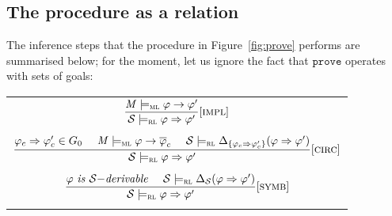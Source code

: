 \documentclass[conference]{IEEEtran}
\newenvironment{todo}{\medskip\hrule\smallskip\noindent}{\smallskip\hrule\medskip}
\newcommand{\vr}[1]{\begin{todo}\textcolor{blue}{Vlad:}\\ \color{orange}{#1}\color{black}\end{todo}}
\newcommand{\vr}[1]{}
\newcommand{\M}{\mathit{M}}
\renewcommand{\S}{\mathcal{S}}
\newcommand{\Ra}{\Rightarrow}
\renewcommand{\implies}{\rightarrow}
\newcommand{\ML}{\textsc{ml}\xspace}
\newcommand{\RL}{\textsc{rl}\xspace}
\newcommand{\rrule}[2]{{#1} \Ra{#2}}
\newcommand{\modelsml}{\models_\ML}
\newcommand{\modelsrl}{\models_\RL}
\newcommand{\coqtt}[1]{{\small \texttt{#1}}}
\newcommand{\cand}{\pmb{\land}}
\newcommand{\cforall}{\pmb{\forall}}
\begin{document}
%
%
%
%





\subsection{The procedure as a relation}
\label{sec:ps}


The inference steps that the procedure in Figure~\ref{fig:prove} performs are summarised below;
for the moment, let us ignore the fact that $\texttt{prove}$ operates with sets of goals:\\



\begin{center}
\begin{tabular}{c}
$\dfrac{\M\modelsml \varphi \implies \varphi'}{\S \modelsrl \rrule{\varphi}{\varphi'}}{[\textsc{impl}]}$\\\\
$\dfrac{ \rrule{\varphi_c}{\varphi'_c} \in G_0 ~~~~ \M\modelsml \varphi \implies \overline{\varphi}_{c}~~~~ \S \modelsrl \Delta_{\{ \rrule{\varphi_c}{\varphi'_c} \}}(\rrule{\varphi}{\varphi'})}
{ \S \modelsrl \rrule{\varphi}{\varphi'}}{[\textsc{circ}]}$\\\\
$\dfrac{\varphi~\mathit{is}~\S\mathit{-derivable} ~~~~ \S \modelsrl \Delta_\S(\rrule{\varphi}{\varphi'})}{\S \modelsrl \rrule{\varphi}{\varphi'}}{[\textsc{symb}]}$\\\\
\end{tabular}
\end{center}
\end{document}
